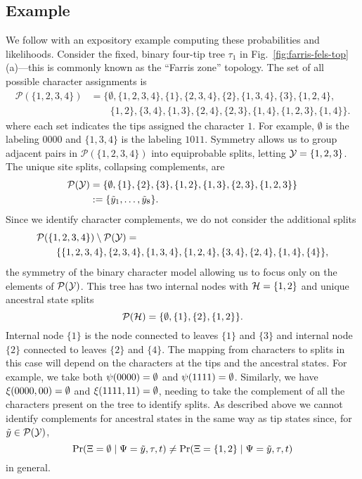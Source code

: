 \subsection*{Example}
We follow with an expository example computing these probabilities and likelihoods.
Consider the fixed, binary four-tip tree $\tau_1$ in Fig.~\ref{fig:farris-fels-top}(a)---this is commonly known as the ``Farris zone'' topology.
The set of all possible character assignments is
\begin{align*}
\mathcal{P}(\{1,2,3,4\}) &= \{\emptyset, \{1,2,3,4\}, \{1\}, \{2,3,4\}, \{2\}, \{1,3,4\}, \{3\}, \{1,2,4\}, \\
                         &\qquad \{1,2\}, \{3,4\}, \{1,3\}, \{2,4\}, \{2,3\}, \{1,4\}, \{1,2,3\}, \{1,4\}\}.
\end{align*}
where each set indicates the tips assigned the character $1$.
For example, $\emptyset$ is the labeling $0000$ and $\{1,3,4\}$ is the labeling $1011$.
Symmetry allows us to group adjacent pairs in $\mathcal{P}(\{1,2,3,4\})$ into equiprobable splits, letting $\mathcal{Y}=\{1,2,3\}$.
The unique site splits, collapsing complements, are
\begin{align*}
    \mathcal{P}(\mathcal{Y}) &= \{\emptyset, \{1\}, \{2\}, \{3\}, \{1,2\}, \{1,3\}, \{2,3\}, \{1,2,3\}\} \\
& := \{\tilde{y}_1, \ldots, \tilde{y}_8\}.
\end{align*}
Since we identify character complements, we do not consider the additional splits
\begin{equation*}
\begin{split}
& \mathcal{P}(\{1,2,3,4\}) \setminus \mathcal{P}(\mathcal{Y}) = \\
&\qquad \{\{1,2,3,4\}, \{2,3,4\}, \{1,3,4\}, \{1,2,4\}, \{3,4\}, \{2,4\}, \{1,4\}, \{4\}\},
\end{split}
\end{equation*}
the symmetry of the binary character model allowing us to focus only on the elements of $\mathcal{P}(\mathcal{Y})$.
This tree has two internal nodes with $\mathcal{H}=\{1,2\}$ and unique ancestral state splits
$$
\mathcal{P}(\mathcal{H}) = \{\emptyset, \{1\}, \{2\}, \{1,2\}\}.
$$
Internal node $\{1\}$ is the node connected to leaves $\{1\}$ and $\{3\}$ and internal node $\{2\}$ connected to leaves $\{2\}$ and $\{4\}$.
The mapping from characters to splits in this case will depend on the characters at the tips and the ancestral states.
For example, we take both $\psi(0000)=\emptyset$ and $\psi(1111)=\emptyset$.
Similarly, we have $\xi(0000, 00) = \emptyset$ and $\xi(1111, 11)=\emptyset$, needing to take the complement of all the characters present on the tree to identify splits.
As described above we cannot identify complements for ancestral states in the same way as tip states since, for $\tilde{y}\in\mathcal{P}(\mathcal{Y})$,
$$
\Pr(\Xi=\emptyset \mid \Psi=\tilde{y}, \tau, t)\neq \Pr(\Xi=\{1,2\} \mid \Psi=\tilde{y}, \tau, t)
$$
in general.

